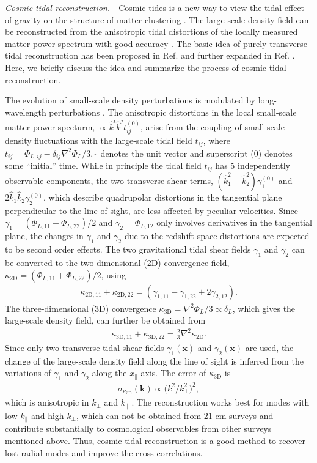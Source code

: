\documentclass[aps,prl,twocolumn,showpacs,superscriptaddress,groupedaddress,nofootinbib,floatfix]{revtex4}  %
\newcommand{\mr}{\mathrm}
\begin{document}
{\it Cosmic tidal reconstruction.}---Cosmic tides is a new way to view the
tidal effect of gravity on the structure of matter clustering \cite{2012:pen}.
The large-scale density field can be reconstructed from the anisotropic tidal 
distortions of the locally measured matter power spectrum with good
accuracy \cite{2012:pen,2015:zhu}.
The basic idea of purely transverse tidal reconstruction has been proposed in
Ref. \cite{2012:pen} and further expanded in Ref. \cite{2015:zhu}.
Here, we briefly discuss the idea and summarize the process of cosmic
tidal reconstruction. 

The evolution of small-scale density perturbations is modulated by 
long-wavelength perturbations \cite{2014:tidal}. 
The anisotropic distortions in the local small-scale matter power specturm,
$\propto\hat{k}^i\hat{k}^jt_{ij}^{(0)}$, arise from the coupling of small-scale
density fluctuations with the large-scale tidal field $t_{ij}$, where 
$t_{ij}=\Phi_{L,ij}-\delta_{ij}\nabla^2\Phi_L/3$, $\hat{\ }$ denotes the 
unit vector and superscript (0) denotes some ``initial'' time. 
While in principle the tidal field $t_{ij}$ has 5 independently observable
components, the two transverse shear terms, 
$(\hat{k}^2_1-\hat{k}^2_2)\gamma_1^{(0)}$ and 
$2\hat{k}_1\hat{k}_2\gamma_2^{(0)}$, 
which describe quadrupolar distortions in the tangential plane perpendicular
to the line of sight, are less affected by peculiar velocities.
Since $\gamma_1=(\Phi_{L,11}-\Phi_{L,22})/2$ and $\gamma_2=\Phi_{L,12}$
only involves derivatives in the tangential plane, the changes in $\gamma_1$
and $\gamma_2$ due to the redshift space distortions are expected to be second
order effects. 
The two gravitational tidal shear fields $\gamma_1$ and $\gamma_2$
can be converted to the two-dimensional (2D) convergence field, 
$\kappa_\mr{2D}=(\Phi_{L,11}+\Phi_{L,22})/2$, using
\begin{eqnarray}
\label{eq:kappa2d}
\kappa_{\mr{2D},11}+\kappa_{\mr{2D},22}=
(\gamma_{1,11}-\gamma_{1,22}+2\gamma_{2,12}).
\end{eqnarray}
The three-dimensional (3D) convergence $\kappa_\mr{3D}=\nabla^2\Phi_L/3\propto\delta_L$, which gives
the large-scale density field, can further be obtained from
\begin{eqnarray}
\label{eq:kappa3d}
\kappa_{\mr{3D},11}+\kappa_{\mr{3D},22}=\frac{2}{3}\nabla^2\kappa_\mr{2D}.
\end{eqnarray}
Since only two transverse tidal shear fields $\gamma_1(\bm{x})$ and 
$\gamma_2(\bm{x})$ are used, the change of the large-scale density field along
the line of sight is inferred from the variations of $\gamma_1$ and $\gamma_2$
along the $x_\parallel$ axis. The error of $\kappa_\mr{3D}$ is 
\begin{eqnarray}
\sigma_{\kappa_\mr{3D}}(\bm{k})\propto\big({k^2}/{k_\perp^2}\big)^2,
\end{eqnarray}
which is anisotropic in $k_\perp$ and $k_\parallel$ \cite{2015:zhu}.
The reconstruction works best for modes with low $k_\parallel$ and high 
$k_\perp$, which can not be obtained from 21 cm surveys and contribute 
substantially to cosmological observables from other surveys mentioned above.
Thus, cosmic tidal reconstruction is a good method to recover lost 
radial modes and improve the cross correlations.
\end{document}
